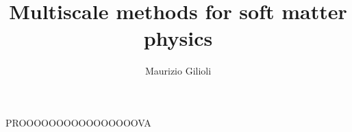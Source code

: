 \documentclass[oneside]{book}
\title{\Huge \textbf{Multiscale methods for soft matter physics}}
\author{
  Maurizio Gilioli \\
}
\date{}
\begin{document}
\maketitle
\tableofcontents

PROOOOOOOOOOOOOOOOVA

\end{document}
